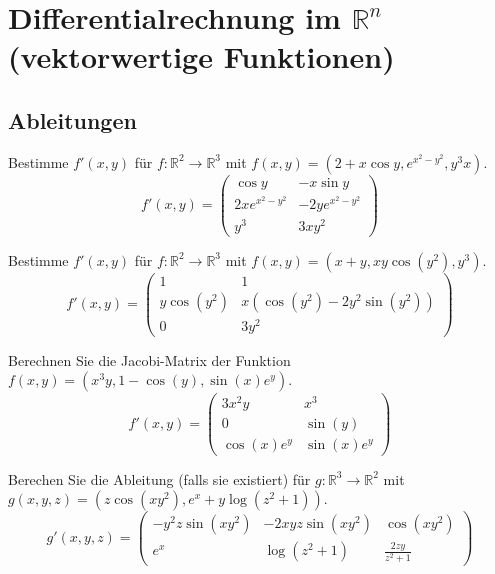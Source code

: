 \section{Differentialrechnung im $\mathbb{R}^n$ (vektorwertige Funktionen)}
\subsection{Ableitungen}
Bestimme $f'(x,y)$ für $f : \mathbb{R}^2 \to \mathbb{R}^3$ mit $f(x,y) = (2 + x \cos y, e^{x^2 - y^2}, y^3 x)$.
\begin{displaymath}
  f'(x,y) = 
  \begin{pmatrix}
    \cos y & -x \sin y\\
    2x e^{x^2 - y^2} & -2y e^{x^2 - y^2}\\
    y^3 & 3xy^2
  \end{pmatrix}
\end{displaymath}

Bestimme $f'(x,y)$ für $f : \mathbb{R}^2 \to \mathbb{R}^3$ mit $f(x,y) = (x + y, xy\cos(y^2), y^3)$.
\begin{displaymath}
  f'(x,y) = 
  \begin{pmatrix}
    1 & 1\\
    y\cos(y^2) & x(\cos(y^2) - 2y^2\sin(y^2))\\
    0 & 3y^2
  \end{pmatrix}
\end{displaymath}

Berechnen Sie die Jacobi-Matrix der Funktion $f(x,y) = (x^3y, 1 - \cos(y), \sin(x)e^y)$.
\begin{displaymath}
  f'(x,y) =
  \begin{pmatrix}
    3x^2y & x^3\\
    0 & \sin(y)\\
    \cos(x)e^y & \sin(x)e^y
  \end{pmatrix}
\end{displaymath}

Berechen Sie die Ableitung (falls sie existiert) für $g : \mathbb{R}^3 \to \mathbb{R}^2$ mit $g(x,y,z) = (z \cos(xy^2), e^x + y \log(z^2 + 1))$.
\begin{displaymath}
  g'(x,y,z) = 
  \begin{pmatrix}
    -y^2z \sin(xy^2) & -2xyz \sin(xy^2) & \cos(xy^2)\\
    e^x & \log(z^2 + 1) & \frac{2zy}{z^2 + 1}
  \end{pmatrix}
\end{displaymath}

